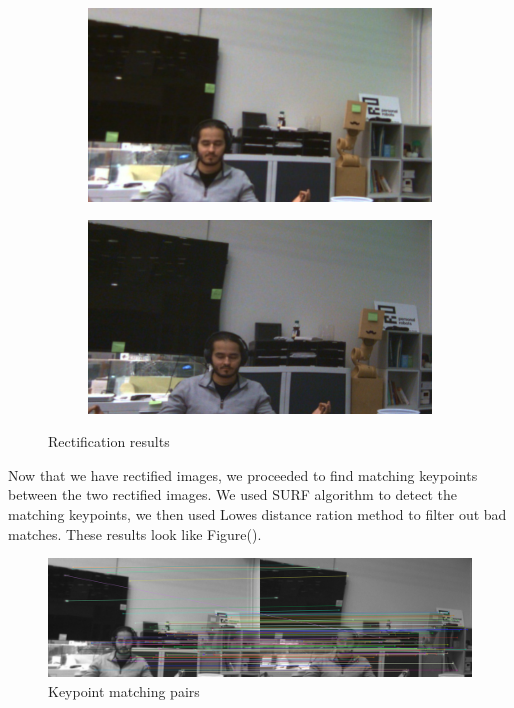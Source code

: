 \documentclass[12pt,letterpaper]{article}
\begin{document}
\begin{figure}[htb]
	\centering
	\begin{subfigure}[c]{0.4\linewidth} 
		\includegraphics[width=\linewidth]{./images/stereo_calibrated_left.png}
	\end{subfigure}
	\begin{subfigure}[c]{0.4\linewidth}
		\includegraphics[width=\linewidth]{./images/stereo_calibrated_right.png}
	\end{subfigure}
	\caption{Rectification results}
	\label{rectification_results}
\end{figure}

Now that we have rectified images, we proceeded to find matching keypoints between the two rectified images. We used SURF algorithm to detect the matching keypoints, we then used Lowes distance ration method to filter out bad matches. These results look like Figure().

\begin{figure}[hbt]
	\includegraphics[width=\linewidth]{./images/eval2_matches_9.png}
	\caption{Keypoint matching pairs}
	\label{keypoint_matching}
\end{figure}
\end{document}

